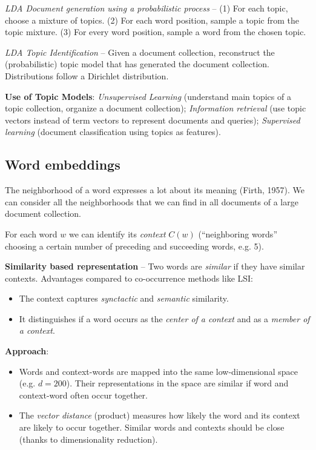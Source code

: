     \emph{LDA Document generation using a probabilistic process} -- (1) For each topic, choose a mixture of topics. (2) For each word position, sample a topic from the topic mixture. (3) For every word position, sample a word from the chosen topic.

    \emph{LDA Topic Identification} -- Given a document collection, reconstruct the (probabilistic) topic model that has generated the document collection. Distributions follow a Dirichlet distribution.

    \textbf{Use of Topic Models}: \emph{Unsupervised Learning} (understand main topics of a topic collection, organize a document collection); \emph{Information retrieval} (use topic vectors instead of term vectors to represent documents and queries); \emph{Supervised learning} (document classification using topics as features).

\subsection{Word embeddings} %
\label{sub:word_embeddings}
  The neighborhood of a word expresses a lot about its meaning (Firth, 1957). We can consider all the neighborhoods that we can find in all documents of a large document collection.

  For each word $w$ we can identify its \emph{context} $C(w)$ (``neighboring words'' choosing a certain number of preceding and succeeding words, e.g. 5).

  \textbf{Similarity based representation} -- Two words are \emph{similar} if they have similar contexts. Advantages compared to co-occurrence methods like LSI:
  \begin{itemize}
    \item The context captures \emph{synctactic} and \emph{semantic} similarity.
    \item It distinguishes if a word occurs as the \emph{center of a context} and as a \emph{member of a context}.
  \end{itemize}

  \textbf{Approach}:
  \begin{itemize}
    \item Words and context-words are mapped into the same low-dimensional space (e.g. $d = 200$). Their representations in the space are similar if word and context-word often occur together.
    \item The \emph{vector distance} (product) measures how likely the word and its context are likely to occur together. Similar words and contexts should be close (thanks to dimensionality reduction).
  \end{itemize}

